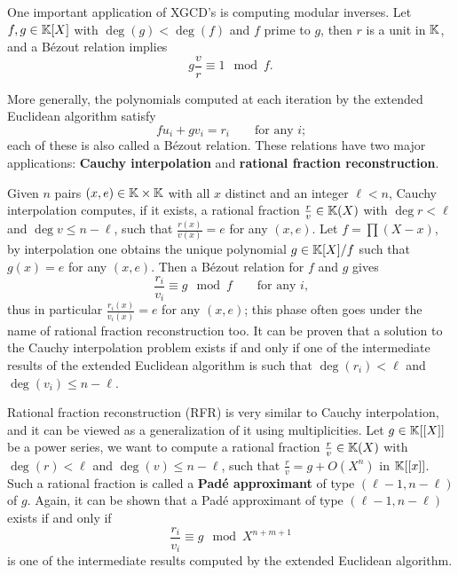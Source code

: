One important application of XGCD's is computing modular inverses. Let
$f,g\in\mathbb{K}[X]$ with $\deg(g)<\deg(f)$ and $f$ prime to $g$, then $r$ is
a unit in $\mathbb{K}$, and a Bézout relation implies
\begin{equation}
  \label{eq:206}
  g\frac{v}{r} \equiv 1 \mod f
  \text{.}
\end{equation}

More generally, the polynomials computed at each iteration by the
extended Euclidean algorithm satisfy
\begin{equation}
  \label{eq:156}
  fu_i + gv_i =  r_i
  \qquad\text{for any $i$;}
\end{equation}
each of these is also called a Bézout relation. These relations have
two major applications: \textbf{Cauchy interpolation} and \textbf{rational
  fraction reconstruction}.

Given $n$ pairs $(x,e)\in\mathbb{K}\times\mathbb{K}$ with all $x$ distinct and an
integer $\ell<n$, Cauchy interpolation
computes, if it exists, a rational fraction $\frac{r}{v}\in\mathbb{K}(X)$ with
$\deg r<\ell$ and $\deg v \le n-\ell$, such that $\frac{r(x)}{v(x)}=e$
for any $(x,e)$. Let $f=\prod (X-x)$, by interpolation one obtains the
unique polynomial $g\in\mathbb{K}[X]/f$ such that $g(x)=e$ for any
$(x,e)$. Then a Bézout relation for $f$ and $g$ gives
\begin{equation}
  \label{eq:207}
  \frac{r_i}{v_i} \equiv g \mod f
  \qquad\text{for any $i$,}
\end{equation}
thus in particular $\frac{r_i(x)}{v_i(x)}=e$ for any $(x,e)$; this
phase often goes under the name of rational fraction reconstruction
too. It can be proven that a solution to the Cauchy interpolation
problem exists if and only if one of the intermediate results of the
extended Euclidean algorithm is such that $\deg(r_i)<\ell$ and
$\deg(v_i)\le n-\ell$.

Rational fraction
reconstruction (RFR) is very similar to Cauchy
interpolation, and it can be viewed as a generalization of it using
multiplicities. Let $g\in\mathbb{K}[[X]]$ be a power series, we want to
compute a rational fraction $\frac{r}{v}\in\mathbb{K}(X)$ with $\deg(r)<\ell$
and $\deg(v)\le n-\ell$, such that $\frac{r}{v}=g+O(X^n)$ in
$\mathbb{K}[[x]]$. Such a rational fraction is called a
\textbf{Padé approximant} of type
$(\ell-1,n-\ell)$ of $g$. Again, it can be shown that a Padé
approximant of type $(\ell-1,n-\ell)$ exists if and only if
\begin{equation}
  \label{eq:210}
  \frac{r_i}{v_i}\equiv g \mod X^{n+m+1}
\end{equation}
is one of the intermediate results computed by the extended Euclidean
algorithm.

